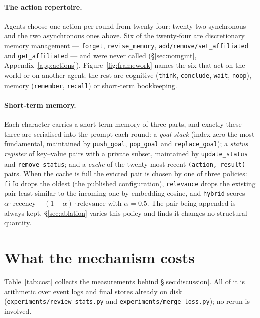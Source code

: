 \documentclass{article}
\newcommand{\code}[1]{\texttt{\small #1}}
\begin{document}
\paragraph{The action repertoire.} Agents choose one action per round from
twenty-four: twenty-two synchronous and the two asynchronous ones above. Six
of the twenty-four are discretionary memory management ---
\code{forget}, \code{revise\_memory}, \code{add/remove/set\_affiliated} and
\code{get\_affiliated} --- and were never called (\S\ref{sec:nomgmt},
Appendix~\ref{app:actions}). Figure~\ref{fig:framework} names the six that act
on the world or on another agent; the rest are cognitive (\code{think},
\code{conclude}, \code{wait}, \code{noop}), memory (\code{remember},
\code{recall}) or short-term bookkeeping.

\paragraph{Short-term memory.} Each character carries a short-term memory of
three parts, and exactly these three are serialised into the prompt each round:
a \emph{goal stack} (index zero the most fundamental, maintained by
\code{push\_goal}, \code{pop\_goal} and \code{replace\_goal}); a
\emph{status register} of key--value pairs with a private subset, maintained by
\code{update\_status} and \code{remove\_status}; and a \emph{cache} of the
twenty most recent \code{(action, result)} pairs. When the cache is full the
evicted pair is chosen by one of three policies: \code{fifo} drops the oldest
(the published configuration), \code{relevance} drops the existing pair least
similar to the incoming one by embedding cosine, and \code{hybrid} scores
$\alpha\cdot\text{recency} + (1-\alpha)\cdot\text{relevance}$ with
$\alpha = 0.5$. The pair being appended is always kept. \S\ref{sec:ablation}
varies this policy and finds it changes no structural quantity.

\section{What the mechanism costs}
\label{app:cost}

Table~\ref{tab:cost} collects the measurements behind \S\ref{sec:discussion}.
All of it is arithmetic over event logs and final stores already on disk
(\code{experiments/review\_stats.py} and \code{experiments/merge\_loss.py}); no rerun is involved.
\end{document}
